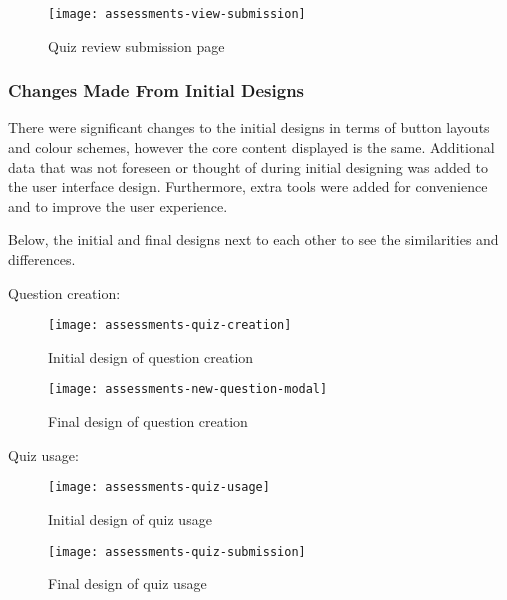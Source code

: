 \begin{figure}[h!]
	\centering
	\texttt{[image: assessments-view-submission]}
	\caption{Quiz review submission page}
\end{figure}


\subsubsection{Changes Made From Initial Designs}
There were significant changes to the initial designs in terms of button layouts and colour schemes, however the core content displayed is the same. Additional data that was not foreseen or thought of during initial designing was added to the user interface design. Furthermore, extra tools were added for convenience and to improve the user experience. 

Below, the initial and final designs next to each other to see the similarities and differences.

Question creation:

\begin{figure}[h!]
	\centering
	\texttt{[image: assessments-quiz-creation]}
	\caption{Initial design of question creation}
\end{figure}

\begin{figure}[h!]
	\centering
	\texttt{[image: assessments-new-question-modal]}
	\caption{Final design of question creation}
\end{figure}


Quiz usage:

\begin{figure}[h!]
	\centering
	\texttt{[image: assessments-quiz-usage]}
	\caption{Initial design of quiz usage}
\end{figure}

\begin{figure}[h!]
	\centering
	\texttt{[image: assessments-quiz-submission]}
	\caption{Final design of quiz usage}
\end{figure}